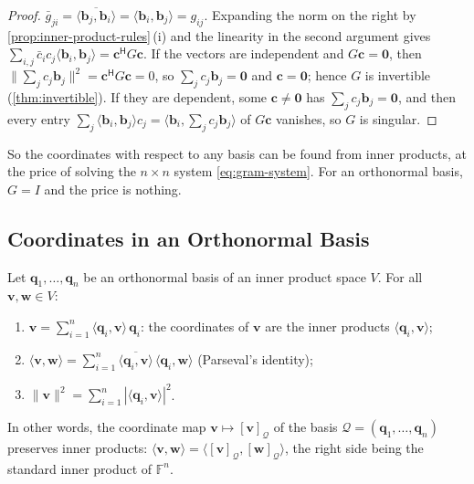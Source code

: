 \begin{proof}
$\bar g_{ji}=\overline{\langle\mathbf b_j,\mathbf b_i\rangle}=\langle\mathbf b_i,\mathbf b_j\rangle=g_{ij}$. Expanding the norm on the right by \cref{prop:inner-product-rules}\,(i) and the linearity in the second argument gives $\sum_{i,j}\bar c_ic_j\langle\mathbf b_i,\mathbf b_j\rangle=\mathbf c^{\mathsf H}G\mathbf c$. If the vectors are independent and $G\mathbf c=\mathbf 0$, then $\|\sum_jc_j\mathbf b_j\|^2=\mathbf c^{\mathsf H}G\mathbf c=0$, so $\sum_jc_j\mathbf b_j=\mathbf 0$ and $\mathbf c=\mathbf 0$; hence $G$ is invertible (\cref{thm:invertible}). If they are dependent, some $\mathbf c\ne\mathbf 0$ has $\sum_jc_j\mathbf b_j=\mathbf 0$, and then every entry $\sum_j\langle\mathbf b_i,\mathbf b_j\rangle c_j=\langle\mathbf b_i,\sum_jc_j\mathbf b_j\rangle$ of $G\mathbf c$ vanishes, so $G$ is singular.
\end{proof}

So the coordinates with respect to any basis can be found from inner products, at the price of solving the $n\times n$ system \eqref{eq:gram-system}. For an orthonormal basis, $G=I$ and the price is nothing.

\subsection{Coordinates in an Orthonormal Basis}

\begin{theorem}
\label{thm:orthonormal-expansion}
Let $\mathbf q_1,\ldots,\mathbf q_n$ be an orthonormal basis of an inner product space $V$. For all $\mathbf v,\mathbf w\in V$:
\begin{enumerate}
\item $\mathbf v=\sum_{i=1}^n\langle\mathbf q_i,\mathbf v\rangle\,\mathbf q_i$: the coordinates of $\mathbf v$ are the inner products $\langle\mathbf q_i,\mathbf v\rangle$;
\item $\langle\mathbf v,\mathbf w\rangle=\sum_{i=1}^n\overline{\langle\mathbf q_i,\mathbf v\rangle}\,\langle\mathbf q_i,\mathbf w\rangle$ (Parseval's identity);
\item $\|\mathbf v\|^2=\sum_{i=1}^n|\langle\mathbf q_i,\mathbf v\rangle|^2$.
\end{enumerate}
In other words, the coordinate map $\mathbf v\mapsto[\mathbf v]_{\mathcal Q}$ of the basis $\mathcal Q=(\mathbf q_1,\ldots,\mathbf q_n)$ preserves inner products: $\langle\mathbf v,\mathbf w\rangle=\langle[\mathbf v]_{\mathcal Q},[\mathbf w]_{\mathcal Q}\rangle$, the right side being the standard inner product of $\mathbb F^n$.
\end{theorem}

